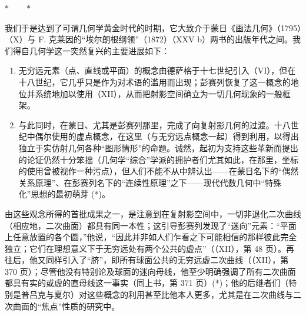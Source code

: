 \begin{center}
\(\ast\qquad\ast\)
\end{center}

我们于是达到了可谓几何学黄金时代的时期，它大致介于蒙日《画法几何》（1795）（X）与 F. 克莱因的“埃尔朗根纲领”（1872）（XXV b）两书的出版年代之间。我们得自几何学这一突然复兴的主要进展如下：

\begin{enumerate}
\def\labelenumi{\Alph{enumi})}
\item
  无穷远元素（点、直线或平面）的概念由德萨格于十七世纪引入（VI），但在十八世纪，它几乎只是作为对术语的滥用而出现；彭赛列恢复了这一概念的地位并系统地加以使用（XII），从而把射影空间确立为一切几何现象的一般框架。
\item
  与此同时，在蒙日、尤其是彭赛列那里，完成了向复射影几何的过渡。十八世纪中偶尔使用的虚点概念，在这里（与无穷远点概念一起）得到利用，以得出独立于实仿射几何各种“图形情形”的命题。诚然，起初为支持这些革新而提出的论证仍然十分笨拙（几何学“综合”学派的拥护者们尤其如此，在那里，坐标的使用曾被视作一种污点），但人们不能不从中辨认出——在蒙日名下的“偶然关系原理”、在彭赛列名下的“连续性原理”之下——现代代数几何中“特殊化”思想的最初萌芽 (*)。
\end{enumerate}

由这些观念所得的首批成果之一，是注意到在复射影空间中，一切非退化二次曲线（相应地，二次曲面）都具有同一本性；这引导彭赛列发现了“迷向”元素：“平面上任意放置的各个圆，”他说，“因此并非如人们乍看之下可能相信的那样彼此完全独立；它们在理想意义下于无穷远处有两个公共的虚点”（（XII），第 48 页）。再往后，他又同样引入了“脐”，即所有球面公共的无穷远虚二次曲线（（XII），第 370 页）；尽管他没有特别论及球面的迷向母线，他至少明确强调了所有二次曲面都具有实的或虚的直母线这一事实（同上书，第 371 页）(*)；他的后继者们（特别是普吕克与夏尔）对这些概念的利用甚至比他本人更多，尤其是在二次曲线与二次曲面的“焦点”性质的研究中。

